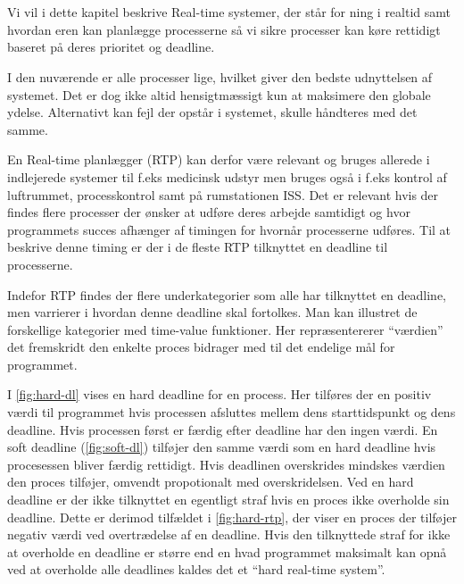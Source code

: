 \chapter{\ds}
Vi vil i dette kapitel beskrive Real-time systemer, der står for \sched ning i realtid samt  hvordan \sched eren kan planlægge processerne så vi sikre processer kan køre rettidigt baseret på deres prioritet og deadline.

I den nuværende \csp er alle processer lige, hvilket giver den bedste udnyttelsen af systemet. Det er dog ikke altid hensigtmæssigt kun at maksimere den globale ydelse. Alternativt kan fejl der opstår i systemet, skulle håndteres med det samme. 

En Real-time planlægger (RTP) kan derfor være relevant og bruges allerede i  indlejerede systemer til f.eks medicinsk udstyr men bruges også i f.eks kontrol af luftrummet,  processkontrol samt på rumstationen ISS\cite{Audsley1990}. Det er  relevant  hvis der findes flere processer der ønsker at udføre deres arbejde samtidigt og hvor programmets succes afhænger af timingen for hvornår processerne udføres. Til at beskrive denne timing er der i de fleste RTP tilknyttet en deadline til processerne.

Indefor RTP findes der flere underkategorier som alle har tilknyttet en deadline, men varrierer i hvordan denne deadline skal fortolkes. Man kan illustret de forskellige kategorier med time-value funktioner. Her repræsentererer ``værdien'' det fremskridt den enkelte proces bidrager med til det endelige mål for programmet.

I \vref{fig:hard-dl} vises en hard deadline for en process. Her tilføres der en positiv værdi til programmet hvis processen afsluttes mellem dens starttidspunkt og dens deadline. Hvis processen først er færdig efter deadline har den ingen værdi. En soft deadline (\vref{fig:soft-dl}) tilføjer den samme værdi som en hard deadline hvis procesessen bliver færdig rettidigt. Hvis deadlinen overskrides mindskes værdien den proces tilføjer, omvendt propotionalt med overskridelsen. Ved en hard deadline er der ikke tilknyttet en egentligt straf hvis en proces ikke overholde sin deadline. Dette er derimod tilfældet i \vref{fig:hard-rtp}, der viser en proces der tilføjer negativ værdi ved overtrædelse af en deadline. Hvis den tilknyttede straf for ikke at overholde en deadline er større end en hvad programmet maksimalt kan opnå ved at overholde alle deadlines kaldes det et ``hard real-time system''\cite{Laprie1989}.

